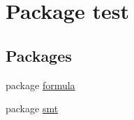 \hypertarget{namespacetest}{}\section{Package test}
\label{namespacetest}
\subsection*{Packages}
\begin{DoxyCompactItemize}
\item 
package \hyperlink{namespacetest_1_1formula}{formula}
\item 
package \hyperlink{namespacetest_1_1smt}{smt}
\end{DoxyCompactItemize}
